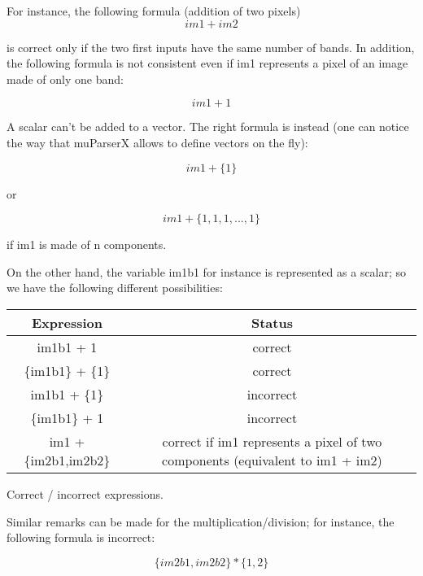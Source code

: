 For instance, the following formula (addition of two pixels)
\begin{equation}
  im1+im2
\end{equation}
\label{firstequation}

is correct only if the two first inputs have the same number of bands. 
In addition, the following formula is not consistent even if im1 
represents a pixel of an image made of only one band:

\begin{equation}
  im1+1
\end{equation}

A scalar can't be added to a vector. The right formula is instead 
(one can notice the way that muParserX allows to define vectors on the fly):

\begin{equation}
  im1+\{ 1 \}
\end{equation}

or

\begin{equation}
  im1 + \{1,1,1,...,1\}
\end{equation}

if im1 is made of n components. 

On the other hand, the variable im1b1 for instance is represented as a 
scalar; so we have the following different possibilities:

\begin{center} 
\begin{tabular}{||c|c||}
\hline
\bf Expression & \bf Status \\
\hline\hline
im1b1 + 1 & correct \\
\{im1b1\} + \{1\} & correct \\
im1b1 + \{1\} & incorrect \\
\{im1b1\} + 1 & incorrect \\
im1 + \{im2b1,im2b2\} & correct if im1 represents a pixel of two components (equivalent to  im1 + im2) \\
\hline
\end{tabular}
\end{center}
\caption{Correct / incorrect expressions.}
\label{correctness}


Similar remarks can be made for the multiplication/division; 
for instance, the following formula is incorrect:

\begin{equation}
  \{im2b1,im2b2\} * \{1,2\}
\end{equation}

